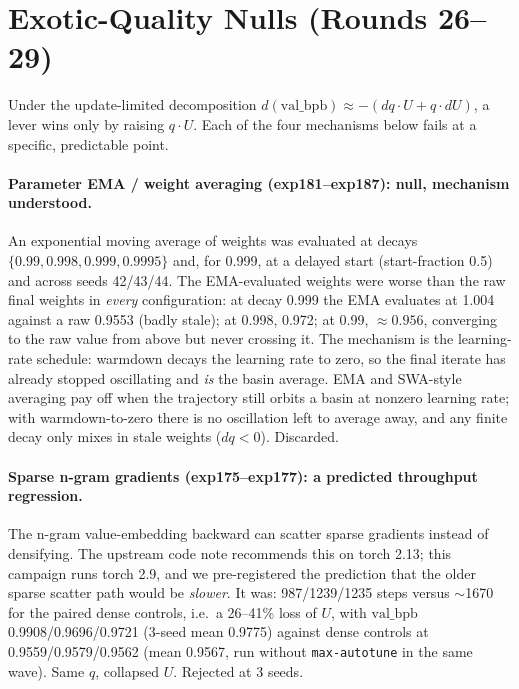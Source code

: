 \documentclass{article}
\newcommand{\valbpb}{\mathrm{val\_bpb}}
\begin{document}
\section{Exotic-Quality Nulls (Rounds 26--29)}
\label{sec:nulls}

Under the update-limited decomposition $d(\valbpb) \approx -(dq \cdot U + q \cdot dU)$, a lever wins only by raising $q \cdot U$. Each of the four mechanisms below fails at a specific, predictable point.

\paragraph{Parameter EMA / weight averaging (exp181--exp187): null, mechanism understood.}
An exponential moving average of weights was evaluated at decays $\{0.99, 0.998, 0.999, 0.9995\}$ and, for 0.999, at a delayed start (start-fraction 0.5) and across seeds 42/43/44. The EMA-evaluated weights were worse than the raw final weights in \emph{every} configuration: at decay 0.999 the EMA evaluates at 1.004 against a raw 0.9553 (badly stale); at 0.998, 0.972; at 0.99, $\approx 0.956$, converging to the raw value from above but never crossing it. The mechanism is the learning-rate schedule: warmdown decays the learning rate to zero, so the final iterate has already stopped oscillating and \emph{is} the basin average. EMA and SWA-style averaging \cite{izmailov2018swa} pay off when the trajectory still orbits a basin at nonzero learning rate; with warmdown-to-zero there is no oscillation left to average away, and any finite decay only mixes in stale weights ($dq < 0$). Discarded.

\paragraph{Sparse n-gram gradients (exp175--exp177): a predicted throughput regression.}
The n-gram value-embedding backward can scatter sparse gradients instead of densifying. The upstream code note recommends this on torch 2.13; this campaign runs torch 2.9, and we pre-registered the prediction that the older sparse scatter path would be \emph{slower}. It was: 987/1239/1235 steps versus $\sim$1670 for the paired dense controls, i.e.\ a 26--41\% loss of $U$, with $\valbpb$ 0.9908/0.9696/0.9721 (3-seed mean 0.9775) against dense controls at 0.9559/0.9579/0.9562 (mean 0.9567, run without \texttt{max-autotune} in the same wave). Same $q$, collapsed $U$. Rejected at 3 seeds.
\end{document}
